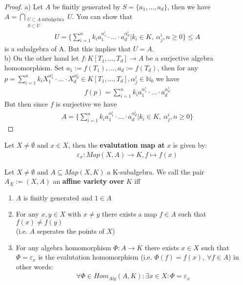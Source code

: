 \documentclass[]{article}
\begin{document}
\begin{proof}
    a) Let \(A\) be finitly generated by \(S = \{a_1, \dots , a_d\}\), then we have \(A = \bigcap_{\substack{U \subset A \ \text{subalgebra} \\ S \subset U}} U\). You can show that 
    \begin{align*}
        U = \{\sum_{i=1}^{n}k_i a_1^{\alpha_1^i} \cdot \dots \cdot a_d^{\alpha_d^i}\vert k_i \in K, \ \alpha_j^i, n \geq 0\} \leq A
    \end{align*}
    is a subalgebra of A. But this implies that \(U = A\). \\
    b) On the other hand let \(f: K[T_1, \dots, T_d] \rightarrow A\) be a
    surjective algebra homomorphism. Set \(a_1 := f(T_1), \dots, a_d := f(T_d)\), then for any \(p = \sum_{i=1}^{n} k_i X_1^{\alpha_1^i} \cdot \dots \cdot X_d^{\alpha^i_d} \in K[T_1, \dots, T_d], \alpha_j^i \in \mathbb{N}_0\) we have
    \begin{align*}
        f(p)=\sum_{i=1}^{n}k_i a_1^{\alpha_1^i} \cdot \dots \cdot a_d^{\alpha^i_d}    
    \end{align*}
    But then since \(f\) is surjective we have 
    \begin{align*}
        A = \{\sum_{i=1}^{n}k_i a_1^{\alpha_1^i} \cdot \dots \cdot a_d^{\alpha_d^i}\vert k_i \in K, \ \alpha_j^i, n \geq 0\}
    \end{align*}
\end{proof}

\begin{definition*}
   Let \(X \neq \emptyset\) and \(x \in X\), then the \textbf{evalutation map at} \(x\) is given by:
   \begin{align*}
    \varepsilon_x: Map(X,A) \rightarrow K, f \mapsto f(x)
   \end{align*}
\end{definition*}

\begin{definition}
    Let \(X \neq \emptyset\) and \(A \subseteq Map(X,K)\) a K-subalgebra. We call the pair \(A_X := (X, A)\) an \textbf{affine variety over} \(K\) iff
\begin{enumerate}[label=\roman*)]
    \item \(A\) is finitly generated and \(1 \in A\)
    \item For any \(x, y \in X\) with \(x \neq y\) there exists a map \(f \in A\) such that \(f(x) \neq f(y)\)  \\
    (i.e. \(A\) seperates the points of \(X\))
    \item For any algebra homomorphism \(\Phi: A \rightarrow K\) there exists \(x \in X\) such that \(\Phi = \varepsilon_x \) is the evalutation homomorphism
    (i.e. \(\Phi(f)= f(x), \ \forall f \in A\)) in other words:
    \begin{align*}
        \forall \Phi \in Hom_{Alg}(A,K): \exists x \in X: \Phi = \varepsilon_x
    \end{align*}
\end{enumerate}
\label{def:affine variety}
\end{definition}
\end{document}
